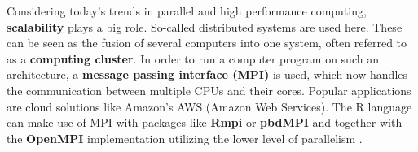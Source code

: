 \documentclass[20pt,margin=1in,innermargin=-4.5in,blockverticalspace=-0.25in]{tikzposter}
\begin{document}
\begin{columns}
{	Considering today's trends in parallel and high performance computing, \textcolor{earthyellow}{\textbf{scalability}} plays a big role. So-called distributed systems are used here. These can be seen as the fusion of several computers into one system, often referred to as a \textbf{computing cluster}. In order to run a computer program on such an architecture, a \textbf{message passing interface (MPI)} is used, which now handles the communication between multiple CPUs and their cores. Popular applications are cloud solutions like Amazon's AWS (Amazon Web Services). The R language can make use of MPI with packages like \textbf{Rmpi} or \textbf{pbdMPI} \cite{cite:chapple2016mastering} and together with the \textbf{OpenMPI} implementation utilizing the lower level of parallelism \cite{cite:robey2021parallel}.
	
	}


\end{columns}
\end{document}
